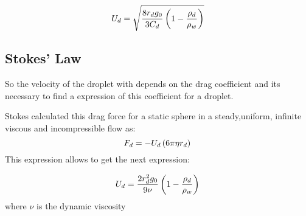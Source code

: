\documentclass{article}
\begin{document}
\begin{equation}
U_d=\sqrt{\frac{8r_dg_0}{3C_d}\left(1-\frac{\rho_d}{\rho_w}\right) }\\
\end{equation}

\subsection{Stokes' Law}
So the velocity of the droplet with depends on the drag coefficient and its necessary to find a expression of this coefficient for a droplet.

Stokes calculated this drag force for a static sphere in a steady,uniform, infinite viscous and incompressible flow as:
\begin{equation}
F_d=-U_d\left(6\pi\eta r_d\right) \\
\end{equation}
This expression allows to get the next expression:

\begin{equation}
U_d=\frac{2r_d^2g_0}{9\nu}\left(1-\frac{\rho_d}{\rho_w}\right) \\
\end{equation}
where $\nu$ is the dynamic viscosity
\end{document}
